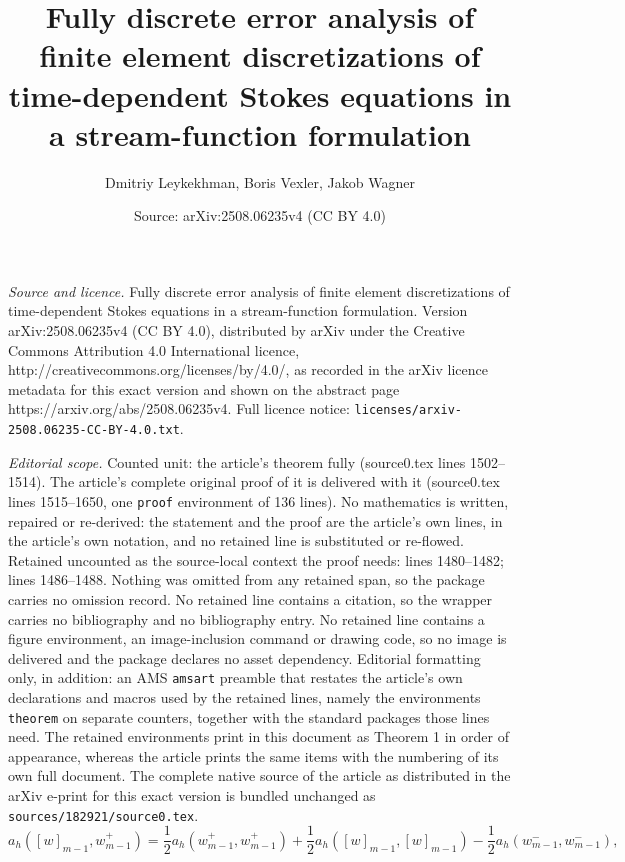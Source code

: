 \documentclass[10pt,a4paper]{amsart}
\title{Fully discrete error analysis of finite element discretizations of time-dependent Stokes equations in a stream-function formulation}
\author{Dmitriy Leykekhman, Boris Vexler, Jakob Wagner}
\date{Source: arXiv:2508.06235v4 (CC BY 4.0)}
\begin{document}
\maketitle

\noindent\emph{Source and licence.} Fully discrete error analysis of finite element discretizations of time-dependent Stokes equations in a stream-function formulation. Version arXiv:2508.06235v4 (CC BY 4.0), distributed by arXiv under the Creative Commons Attribution 4.0 International licence, http://creativecommons.org/licenses/by/4.0/, as recorded in the arXiv licence metadata for this exact version and shown on the abstract page https://arxiv.org/abs/2508.06235v4. Full licence notice: \texttt{licenses/arxiv-2508.06235-CC-BY-4.0.txt}.\par\smallskip

\noindent\textit{Editorial scope.} Counted unit: the article's theorem fully (source0.tex lines 1502--1514). The article's complete original proof of it is delivered with it (source0.tex lines 1515--1650, one \texttt{proof} environment of 136 lines). No mathematics is written, repaired or re-derived: the statement and the proof are the article's own lines, in the article's own notation, and no retained line is substituted or re-flowed.  Retained uncounted as the source-local context the proof needs: lines 1480--1482; lines 1486--1488.  Nothing was omitted from any retained span, so the package carries no omission record.  No retained line contains a citation, so the wrapper carries no bibliography and no bibliography entry.  No retained line contains a figure environment, an image-inclusion command or drawing code, so no image is delivered and the package declares no asset dependency.  Editorial formatting only, in addition: an AMS \texttt{amsart} preamble that restates the article's own declarations and macros used by the retained lines, namely the environments \texttt{theorem} on separate counters, together with the standard packages those lines need.  The retained environments print in this document as Theorem 1 in order of appearance, whereas the article prints the same items with the numbering of its own full document.  The complete native source of the article as distributed in the arXiv e-print for this exact version is bundled unchanged as \texttt{sources/182921/source0.tex}.
\begin{equation}\label{eq:jump_identity ah}
a_h([w]_{m-1}, w_{m-1}^+)=\frac{1}{2}a_h(w^+_{m-1}, w_{m-1}^+)+\frac{1}{2}a_h([w]_{m-1}, [w]_{m-1})-\frac{1}{2}a_h(w_{m-1}^-, w_{m-1}^-),
\end{equation}
\end{document}
